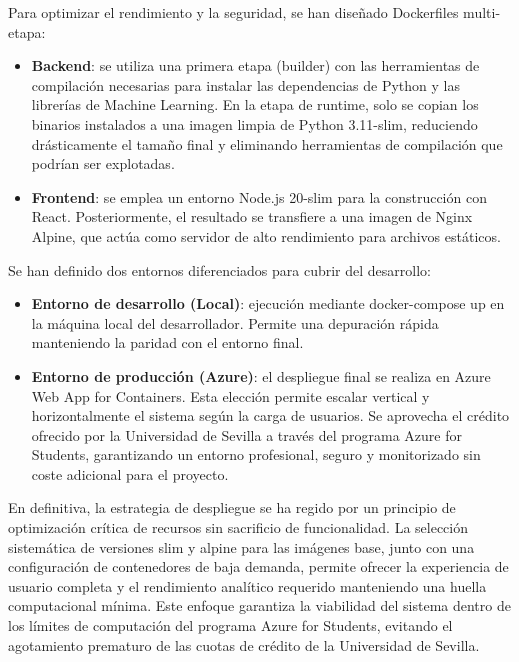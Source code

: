 Para optimizar el rendimiento y la seguridad, se han diseñado Dockerfiles
multi-etapa:

\begin{itemize}
\item \textbf{Backend}: se utiliza una primera etapa (builder) con las
herramientas de compilación necesarias para instalar las dependencias de
Python y las librerías de Machine Learning. En la etapa de runtime, solo se
copian los binarios instalados a una imagen limpia de Python 3.11-slim,
reduciendo drásticamente el tamaño final y eliminando herramientas de
compilación que podrían ser explotadas.
\item \textbf{Frontend}: se emplea un entorno Node.js 20-slim para la
construcción con React. Posteriormente, el resultado se transfiere a una imagen
de Nginx Alpine, que actúa como servidor de alto rendimiento para archivos
estáticos.
\end{itemize}

Se han definido dos entornos diferenciados para cubrir del
desarrollo:

\begin{itemize}
\item \textbf{Entorno de desarrollo (Local)}: ejecución mediante docker-compose
up en la máquina local del desarrollador. Permite una depuración rápida
manteniendo la paridad con el entorno final.
\item \textbf{Entorno de producción (Azure)}: el despliegue final se realiza en
Azure Web App for Containers. Esta elección permite escalar vertical y
horizontalmente el sistema según la carga de usuarios. Se aprovecha el crédito
ofrecido por la Universidad de Sevilla a través del programa Azure for Students,
garantizando un entorno profesional, seguro y monitorizado sin coste adicional
para el proyecto.
\end{itemize}

En definitiva, la estrategia de despliegue se ha regido por un principio de
optimización crítica de recursos sin sacrificio de funcionalidad.
 La selección
 sistemática de versiones slim y alpine para las imágenes base, junto con una
configuración de contenedores de baja demanda, permite ofrecer la experiencia de
usuario completa y el rendimiento analítico requerido manteniendo una huella
computacional mínima. Este enfoque garantiza la viabilidad del sistema dentro de
los límites de computación del programa Azure for Students, evitando el
agotamiento prematuro de las cuotas de crédito de la Universidad de Sevilla.















